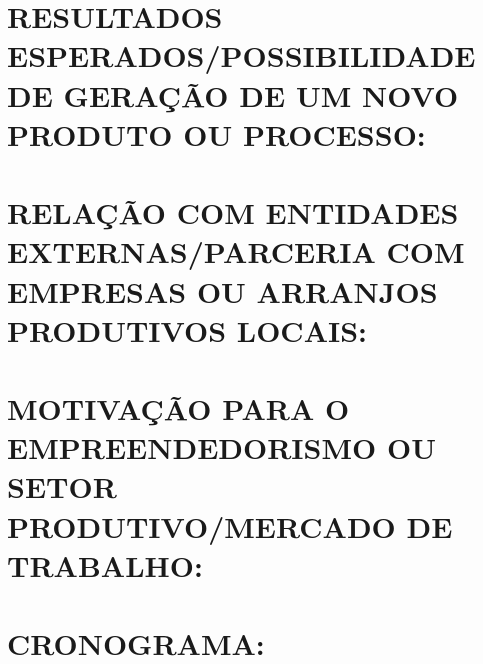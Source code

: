 \documentclass{article}
\begin{document}
\section{RESULTADOS ESPERADOS/POSSIBILIDADE DE GERAÇÃO DE UM NOVO PRODUTO OU PROCESSO:} \label{sec:resultados_esperados}

\section{RELAÇÃO COM ENTIDADES EXTERNAS/PARCERIA COM EMPRESAS OU ARRANJOS PRODUTIVOS LOCAIS:} \label{sec:entidades_externas}

\section{MOTIVAÇÃO PARA O EMPREENDEDORISMO OU SETOR PRODUTIVO/MERCADO DE TRABALHO:} \label{sec:motivação_empreendedorismo}

\section{CRONOGRAMA:} \label{sec:cronograma}
\end{document}
